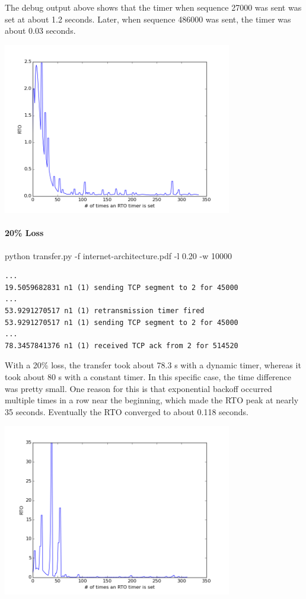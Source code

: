 \documentclass[11pt]{article}
\begin{document}
The debug output above shows that the timer when sequence 27000 was sent was set at about 1.2 seconds. Later, when sequence 486000 was sent, the timer was about 0.03 seconds.

\includegraphics[width=10cm]{../graphs/timeout_10.png}
\paragraph{20\% Loss}
python transfer.py -f internet-architecture.pdf -l 0.20 -w 10000
\begin{lstlisting}
...
19.5059682831 n1 (1) sending TCP segment to 2 for 45000
...
53.9291270517 n1 (1) retransmission timer fired
53.9291270517 n1 (1) sending TCP segment to 2 for 45000
...
78.3457841376 n1 (1) received TCP ack from 2 for 514520
\end{lstlisting}
With a 20\% loss, the transfer took about 78.3 s with a dynamic timer, whereas it took about 80 s with a constant timer. In this specific case, the time difference was pretty small. One reason for this is that exponential backoff occurred multiple times in a row near the beginning, which made the RTO peak at nearly 35 seconds. Eventually the RTO converged to about 0.118 seconds.

\includegraphics[width=10cm]{../graphs/timeout_20.png}
\end{document}
